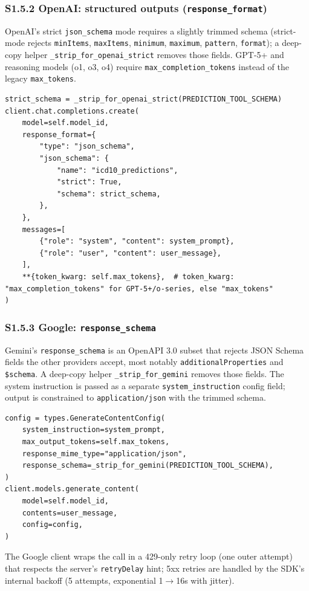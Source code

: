 \subsubsection{\texorpdfstring{S1.5.2 OpenAI: structured outputs (\texttt{response\_format})}{S1.5.2 OpenAI: structured outputs (response\_format)}}\label{s1.5.2-openai-structured-outputs-response_format}

OpenAI's strict \texttt{json\_schema} mode requires a slightly trimmed schema
(strict-mode rejects \texttt{minItems}, \texttt{maxItems}, \texttt{minimum}, \texttt{maximum},
\texttt{pattern}, \texttt{format}); a deep-copy helper \texttt{\_strip\_for\_openai\_strict}
removes those fields. GPT-5+ and reasoning models (o1, o3, o4)
require \texttt{max\_completion\_tokens} instead of the legacy \texttt{max\_tokens}.

\begin{verbatim}
strict_schema = _strip_for_openai_strict(PREDICTION_TOOL_SCHEMA)
client.chat.completions.create(
    model=self.model_id,
    response_format={
        "type": "json_schema",
        "json_schema": {
            "name": "icd10_predictions",
            "strict": True,
            "schema": strict_schema,
        },
    },
    messages=[
        {"role": "system", "content": system_prompt},
        {"role": "user", "content": user_message},
    ],
    **{token_kwarg: self.max_tokens},  # token_kwarg: "max_completion_tokens" for GPT-5+/o-series, else "max_tokens"
)
\end{verbatim}

\subsubsection{\texorpdfstring{S1.5.3 Google: \texttt{response\_schema}}{S1.5.3 Google: response\_schema}}\label{s1.5.3-google-response_schema}

Gemini's \texttt{response\_schema} is an OpenAPI 3.0 subset that rejects
JSON Schema fields the other providers accept, most notably
\texttt{additionalProperties} and \texttt{\$schema}. A deep-copy helper
\texttt{\_strip\_for\_gemini} removes those fields. The system instruction is
passed as a separate \texttt{system\_instruction} config field; output is
constrained to \texttt{application/json} with the trimmed schema.

\begin{verbatim}
config = types.GenerateContentConfig(
    system_instruction=system_prompt,
    max_output_tokens=self.max_tokens,
    response_mime_type="application/json",
    response_schema=_strip_for_gemini(PREDICTION_TOOL_SCHEMA),
)
client.models.generate_content(
    model=self.model_id,
    contents=user_message,
    config=config,
)
\end{verbatim}

The Google client wraps the call in a 429-only retry loop (one
outer attempt) that respects the server's \texttt{retryDelay} hint; 5xx
retries are handled by the SDK's internal backoff (5 attempts,
exponential 1$\rightarrow$16s with jitter).

